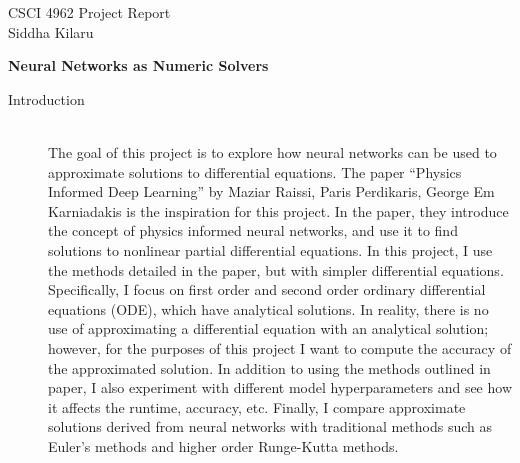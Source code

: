 \documentclass[12pt]{article}
\newcommand{\bgc}{\begin{center}}
\newcommand{\enc}{\end{center}}
\begin{document}
\noindent CSCI 4962 \hfill Project Report \\
Siddha Kilaru \\

\bgc
\textbf{Neural Networks as Numeric Solvers}
\enc

\begin{description}
    \item[Introduction] \hfill \\
    The goal of this project is to explore how neural networks can be used to
    approximate solutions to differential equations. The paper ``Physics
    Informed Deep Learning'' by Maziar Raissi, Paris Perdikaris, George Em
    Karniadakis is the inspiration for this project. In the paper, they
    introduce the concept of physics informed neural networks, and use it to
    find solutions to nonlinear partial differential equations. In this
    project, I use the methods detailed in the paper, but with simpler
    differential equations. Specifically, I focus on first order and second
    order ordinary differential equations (ODE), which have analytical
    solutions. In reality, there is no use of approximating a differential
    equation with an analytical solution; however, for the purposes of this
    project I want to compute the accuracy of the approximated solution. In
    addition to using the methods outlined in paper, I also experiment with
    different model hyperparameters and see how it affects the runtime,
    accuracy, etc. Finally, I compare approximate solutions derived from neural
    networks with traditional methods such as Euler's methods and higher order
    Runge-Kutta methods.


\end{description}
\end{document}
